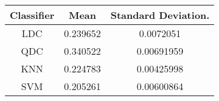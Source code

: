 \begin{tabular}{|c|c|c|}
 \hline 
Classifier & Mean & Standard Deviation. \\ 
 \hline 
LDC & 0.239652 & 0.0072051 \\ 
 \hline 
QDC & 0.340522 & 0.00691959 \\ 
 \hline 
KNN & 0.224783 & 0.00425998 \\ 
 \hline 
SVM & 0.205261 & 0.00600864 \\ 
 \hline 
\end{tabular}